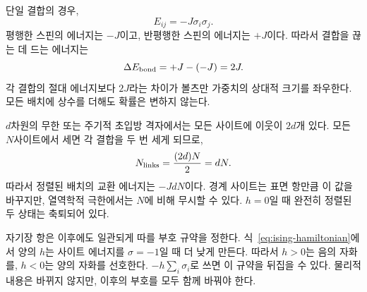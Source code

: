 단일 결합의 경우,
\begin{equation}
E_{ij}=-J\sigma_i\sigma_j.
\end{equation}
평행한 스핀의 에너지는 \(-J\)이고, 반평행한 스핀의 에너지는 \(+J\)이다. 따라서 결합을 끊는 데 드는 에너지는
\begin{equation}
\Delta E_{\rm bond}=+J-(-J)=2J.
\label{eq:broken-bond}
\end{equation}
각 결합의 절대 에너지보다 \(2J\)라는 차이가 볼츠만 가중치의 상대적 크기를 좌우한다. 모든 배치에 상수를 더해도 확률은 변하지 않는다.

\begin{classroomqa}
\end{classroomqa}

\begin{classroomqa}
\end{classroomqa}

\(d\)차원의 무한 또는 주기적 초입방 격자에서는 모든 사이트에 이웃이 \(2d\)개 있다. 모든 \(N\)사이트에서 세면 각 결합을 두 번 세게 되므로,
\begin{equation}
N_{\rm links}=\frac{(2d)N}{2}=dN.
\label{eq:number-links}
\end{equation}
따라서 정렬된 배치의 교환 에너지는 \(-JdN\)이다. 경계 사이트는 표면 항만큼 이 값을 바꾸지만, 열역학적 극한에서는 \(N\)에 비해 무시할 수 있다. \(h=0\)일 때 완전히 정렬된 두 상태는 축퇴되어 있다.

자기장 항은 이후에도 일관되게 따를 부호 규약을 정한다. 식~\eqref{eq:ising-hamiltonian}에서 양의 \(h\)는 사이트 에너지를 \(\sigma=-1\)일 때 더 낮게 만든다. 따라서 \(h>0\)는 음의 자화를, \(h<0\)는 양의 자화를 선호한다. \(-h\sum_i\sigma_i\)로 쓰면 이 규약을 뒤집을 수 있다. 물리적 내용은 바뀌지 않지만, 이후의 부호를 모두 함께 바꿔야 한다.

\begin{classroomqa}
\end{classroomqa}

